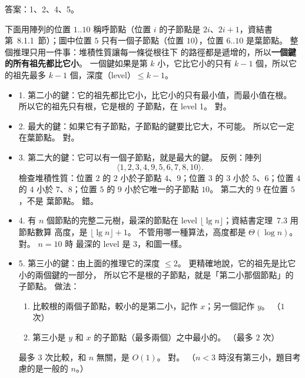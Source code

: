 \begin{pastsoln}
答案：1、2、4、5。

下面用陣列的位置 $1..10$ 稱呼節點（位置 $i$ 的子節點是 $2i$、$2i + 1$，資結書第~8.1.1~節）；圖中位置
$5$ 只有一個子節點（位置 $10$），位置 $6..10$ 是葉節點。 整個推理只用一件事：堆積性質讓每一條從根往下
的路徑都是遞增的，所以\textbf{一個鍵的所有祖先都比它小}。 一個鍵如果是第 $k$ 小，它比它小的只有
$k - 1$ 個，所以它的祖先最多 $k - 1$ 個，深度（level）$\le k - 1$。

\begin{itemize}
\item 1. 第二小的鍵：它的祖先都比它小，比它小的只有最小值，而最小值在根。 所以它的祖先只有根，它是根的
子節點，在 level 1。 對。
\item 2. 最大的鍵：如果它有子節點，子節點的鍵要比它大，不可能。 所以它一定在葉節點。 對。
\item 3. 第二大的鍵：它可以有一個子節點，就是最大的鍵。 反例：陣列
\[
\langle 1, 2, 3, 4, 9, 5, 6, 7, 8, 10\rangle .
\] 檢查堆積性質：位置 $2$ 的 $2$ 小於子節點 $4$、$9$；位置 $3$ 的 $3$ 小於 $5$、$6$；位置
$4$ 的 $4$ 小於 $7$、$8$；位置 $5$ 的 $9$ 小於它唯一的子節點 $10$。 第二大的 $9$ 在位置 $5$，不是
葉節點。 錯。
\item 4. 有 $n$ 個節點的完整二元樹，最深的節點在 level $\lfloor \lg n \rfloor$；資結書定理~7.3 用節點數算
高度，是 $\lfloor \lg n \rfloor + 1$。 不管用哪一種算法，高度都是 $\Theta(\log n)$。 對。 $n = 10$ 時
最深的 level 是 $3$，和圖一樣。
\item 5. 第三小的鍵：由上面的推理它的深度 $\le 2$。 更精確地說，它的祖先是比它小的兩個鍵的一部分，
所以它不是根的子節點，就是「第二小那個節點」的子節點。 做法：
\begin{enumerate}[label=(\roman*)]
\item 比較根的兩個子節點，較小的是第二小，記作 $x$；另一個記作 $y$。 （$1$ 次）
\item 第三小是 $y$ 和 $x$ 的子節點（最多兩個）之中最小的。 （最多 $2$ 次）
\end{enumerate}
最多 $3$ 次比較，和 $n$ 無關，是 $O(1)$。 對。 （$n < 3$ 時沒有第三小，題目考慮的是一般的 $n$。）
\end{itemize}
\end{pastsoln}
